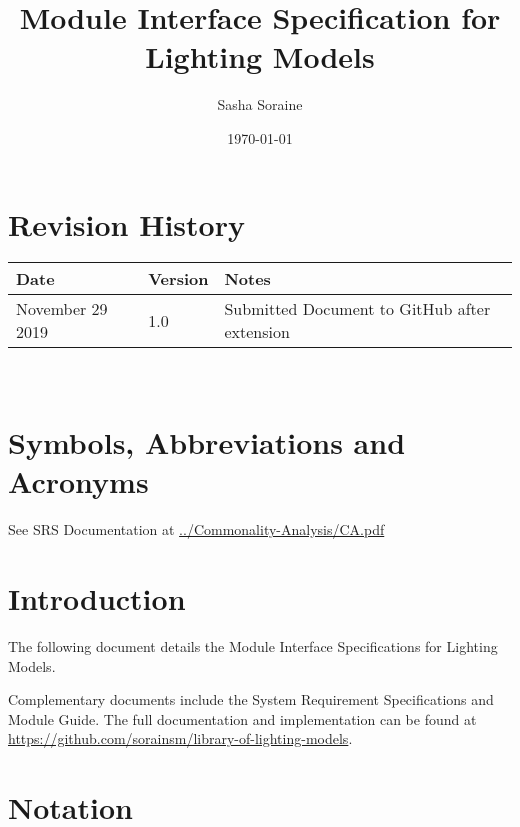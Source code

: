 \documentclass[12pt, titlepage]{article}
\newcommand{\progname}{Lighting Models}
\begin{document}
\title{Module Interface Specification for Lighting Models}\label{mis}

\author{Sasha Soraine}

\date{\today}

\maketitle


\section{Revision History}

\begin{tabularx}{\textwidth}{p{3cm}p{2cm}X}
\toprule {\bf Date} & {\bf Version} & {\bf Notes}\\
\midrule
November 29 2019 & 1.0 & Submitted Document to GitHub after extension\\
\bottomrule
\end{tabularx}

~\newpage

\section{Symbols, Abbreviations and Acronyms}

See SRS Documentation at \url{../Commonality-Analysis/CA.pdf}


\newpage

\tableofcontents

\newpage


\section{Introduction}

The following document details the Module Interface Specifications for
\progname. %

Complementary documents include the System Requirement Specifications
and Module Guide.  The full documentation and implementation can be
found at \url{https://github.com/sorainsm/library-of-lighting-models}.  

\section{Notation}
\end{document}
